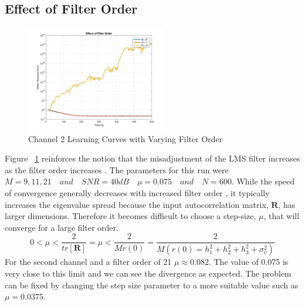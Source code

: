 \documentclass[journal]{IEEEtran}
\begin{document}
\subsection{Effect of Filter Order}
\begin{figure}[H]
  \centering
  \captionsetup{justification=centering,font = small}
  \includegraphics[width=0.55\textwidth, right] {Plots/Project1_Part3.jpg}
  \caption{Channel 2 Learning Curves with Varying Filter Order}
    \label{fig:filterorder1}
\end{figure}
Figure ~\ref{fig:filterorder1} reinforces the notion that the misadjustment
of the LMS filter increases as the filter order increases \cite{goldenberg1985digital}. The parameters for this run were $M = 9, 11, 21 \quad and \quad SNR = 40dB
\quad \mu = 0.075 \quad and \quad N = 600$. While the speed of convergence
generally decreases with increased filter order \cite{goldenberg1985digital}, it typically increases the eigenvalue spread
because the input autocorrelation matrix, $\boldsymbol{R}$, has larger dimensions. Therefore it becomes difficult to
choose a step-size, $\mu$, that will converge for a large filter order.
$$0 < \mu < \dfrac{2}{tr[\boldsymbol{R}]} = \mu < \dfrac{2}{Mr(0)}  = \dfrac{2}{M(r(0) = h_1^2 + h_2^2 + h_3^2 + \sigma^2_v)} $$
For the second channel and a filter order of 21
$\mu \approx 0.082$. The value of 0.075 is very close to this limit and we can see the divergence as expected.
The problem can be fixed by changing the
step size parameter to a more suitable value such as $ \mu = 0.0375$.
\end{document}
